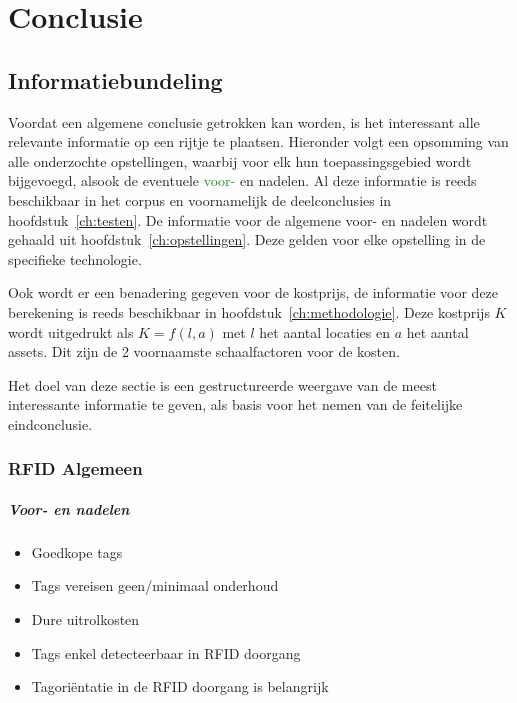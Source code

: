 
\chapter{Conclusie}
\label{ch:conclusie}
\section{Informatiebundeling}
\label{sec:con-inf}
Voordat een algemene conclusie getrokken kan worden, is het interessant alle relevante informatie op een rijtje te plaatsen. Hieronder volgt een opsomming van alle onderzochte opstellingen, waarbij voor elk hun toepassingsgebied wordt bijgevoegd, alsook de eventuele \textcolor{ForestGreen}{voor-} en \textcolor{RedOrange}{nadelen}. Al deze informatie is reeds beschikbaar in het corpus en voornamelijk de deelconclusies in hoofdstuk~\ref{ch:testen}. De informatie voor de algemene voor- en nadelen wordt gehaald uit hoofdstuk~\ref{ch:opstellingen}. Deze gelden voor elke opstelling in de specifieke technologie.

Ook wordt er een benadering gegeven voor de kostprijs, de informatie voor deze berekening is reeds beschikbaar in hoofdstuk~\ref{ch:methodologie}. Deze kostprijs \(K\) wordt uitgedrukt als \(K = f(l, a)\) met \(l\) het aantal locaties en \(a\) het aantal assets. Dit zijn de 2 voornaamste schaalfactoren voor de kosten.

Het doel van deze sectie is een gestructureerde weergave van de meest interessante informatie te geven, als basis voor het nemen van de feitelijke eindconclusie.

\subsection{RFID Algemeen}
\label{sec:con-ant-RFID}
\paragraph{Voor- en nadelen}
\begin{itemize}
	\color{ForestGreen}
	\item Goedkope tags
	\item Tags vereisen geen/minimaal onderhoud
	\color{RedOrange}
	\item Dure uitrolkosten
	\item Tags enkel detecteerbaar in RFID doorgang
	\item Tagoriëntatie in de RFID doorgang is belangrijk
\end{itemize}

